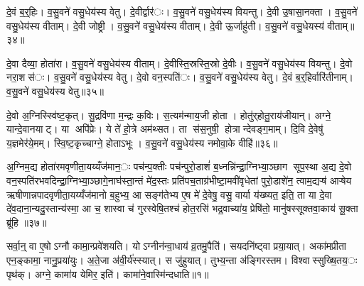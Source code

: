 
दे॒वं ब॒र्॒हिः। व॒सु॒वने॑ वसु॒धेय॑स्य वेतु। दे॒वीर्द्वार॑ः। व॒सु॒वने॑ वसु॒धेय॑स्य वियन्तु। दे॒वी उ॒षासा॒नक्ता। व॒सु॒वने॑ वसु॒धेय॑स्य वीताम्। दे॒वी जोष्ट्री। व॒सु॒वने॑ वसु॒धेय॑स्य वीताम्। दे॒वी ऊ॒र्जाहु॑ती। व॒सु॒वने॑ वसु॒धेयस्य॑ वीताम्॥३४॥

दे॒वा दैव्या॒ होता॑रा। व॒सु॒वने॑ वसु॒धेय॑स्य वीताम्। दे॒वीस्ति॒स्रस्ति॒स्रो दे॒वीः। व॒सु॒वने॑ वसु॒धेय॑स्य वियन्तु। दे॒वो नरा॒शस॑ः। व॒सु॒वने॑ वसु॒धेय॑स्य वेतु। दे॒वो वन॒स्पति॑ः। व॒सु॒वने॑ वसु॒धेय॑स्य वेतु। दे॒वं ब॒र्॒हिर्वारि॑तीनाम्। व॒सु॒वने॑ वसु॒धेय॑स्य वेतु॥३५॥

दे॒वो अ॒ग्निस्स्वि॑ष्ट॒कृत्। सु॒द्रवि॑णा म॒न्द्रः क॒विः। स॒त्यम॑न्माय॒जी होता। होतु॑र्‌होतु॒राय॑जीयान्। अग्ने॒ यान्दे॒वानयाट्। या अपि॑प्रेः। ये ते॑ हो॒त्रे अम॑थ्सत। ता स॑स॒नुषी॒ होत्रान्देवङ्ग॒माम्। दि॒वि दे॒वेषु॑ य॒ज्ञमेर॑ये॒मम्। स्वि॒ष्ट॒कृच्चाग्ने॒ होताऽभूः। व॒सु॒वने॑ वसु॒धेय॑स्य नमोवा॒के वीहि॑॥३६॥


अ॒ग्निम॒द्य होता॑रमवृणीता॒यय्यँज॑मान॒ः पच॑न्प॒क्तीः पच॑न्पुरो॒डाशं॑ ब॒ध्नन्नि॑न्द्रा॒ग्निभ्या॒ञ्छाग सूप॒स्था अ॒द्य दे॒वो वन॒स्पति॑रभवदिन्द्रा॒ग्निभ्या॒ञ्छागे॒नाघ॑स्ता॒न्तं मे॑द॒स्तः प्रति॑पच॒ताग्र॑भीष्टा॒मवी॑वृधेतां पुरो॒डाशे॑न॒ त्वाम॒द्यऱ्ष॑ आऱ्षेय ऋषीणान्नपादवृणीता॒यय्यँज॑मानो ब॒हुभ्य॒ आ सङ्ग॑तेभ्य ए॒ष मे॑ दे॒वेषु॒ वसु॒ वार्या य॑ख्ष्यत॒ इति॒ ता या दे॒वा दे॑व॒दाना॒न्यदु॒स्तान्य॑स्मा॒ आ च॒ शास्वा च॑ गुरस्वेषि॒तश्च॑ होत॒रसि॑ भद्र॒वाच्या॑य॒ प्रेषि॑तो॒ मानु॑षस्सूक्तवा॒काय॑ सू॒क्ता ब्रू॑हि ॥३७॥




सर्वा॒न्॒ वा ए॒षोऽग्नौ कामा॒न्प्रवे॑शयति। योऽग्नीन॑न्वा॒धाय॑ व्र॒तमु॒पैति॑। सयदनि॑ष्ट्वा प्रया॒यात्। अका॑मप्रीता एन॒ङ्कामा॒ नानु॒प्रया॑युः। अ॒ते॒जा अ॑वी॒र्य॑स्स्यात्। स जु॑हुयात्। तुभ्य॒न्ता अ॑ङ्गिरस्तम। विश्वास्सुख्षि॒तय॒ः पृथ॑क्। अग्ने॒ कामा॑य येमिर॒ इति॑। कामा॑ने॒वास्मि॑न्दधाति॥१॥

